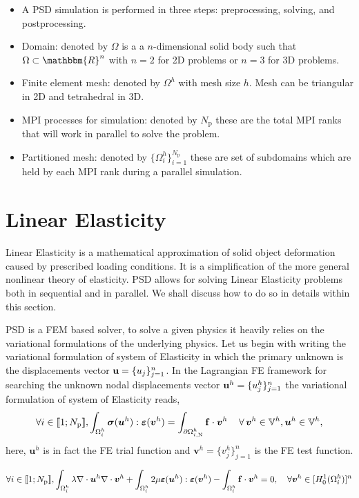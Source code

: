 \documentclass{report}
\newcommand{\bu}{\textbf{u}}
\newcommand{\buh}{\boldsymbol u^h}
\newcommand{\bvh}{\boldsymbol v^h}
\newcommand{\np}{N_\text{p}}
\newcommand{\sig}{\boldsymbol{\sigma}}
\newcommand{\eps}{\boldsymbol{\varepsilon}}
\def\bu{{\bf{u}}}
\begin{document}
\begin{itemize}
    \item A PSD simulation is performed in three steps: preprocessing, solving, and postprocessing. 
    \item Domain: denoted by $\Omega$ is a a $n$-dimensional solid body such that $\Omega \subset \mathbbm{R}^n$ with $n=2$   for 2D problems or  $n=3$ for 3D problems.
    \item Finite element mesh: denoted by $\Omega^h$ with mesh size $h$. Mesh can be triangular in 2D and tetrahedral in 3D.
    \item MPI processes for simulation: denoted by $\np$ these are the total MPI ranks that will work in parallel to solve the problem.
    \item Partitioned mesh: denoted by $\{ \Omega ^h_i \}_{i=1}^{\np}$ these are set of subdomains which are held by each MPI rank during a parallel simulation.
\end{itemize}

\section{Linear Elasticity}
Linear Elasticity is a mathematical approximation of solid object deformation caused by prescribed loading conditions. It is a simplification of the more general nonlinear theory of elasticity. PSD allows for solving Linear Elasticity problems both in sequential and in parallel. We shall discuss how to do so in details within this section.


PSD is a FEM based solver, to solve a given physics it heavily relies on the variational formulations of the underlying physics. Let us begin with writing the variational formulation of system of  Elasticity in which the primary unknown is the displacements vector $\bu=\{u_j\}^n_{j=1}$. In the Lagrangian FE framework for searching the unknown nodal displacements vector $\bu^h=\{u^h_j\}^n_{j=1}$ the variational formulation of system of  Elasticity reads,
%
%
\begin{equation}\label{Eq:Varf}
\forall i \in \llbracket 1; N_{\text p} \rrbracket,  \int_{\Omega^h_i}\sig(\buh) : \eps(\bvh) = \int_{\partial\Omega^h_{i,\text{N}}} \mathbf{f}\cdot\bvh \, \quad\forall\,\bvh\in\mathbb{V}^h,\buh\in\mathbb{V}^h,
\end{equation}
%
here,  $\buh$ is in fact the FE trial function and $\bvh=\{v^h_j\}^n_{j=1}$ is the FE test function.

\begin{equation}\label{Eq:LinearElasticity}
\forall i \in \llbracket 1; N_{\text p} \rrbracket, 
\int_{\Omega^h_i}\lambda\nabla\cdot\buh\nabla\cdot\bvh + \int_{\Omega^h_i}2\mu\boldsymbol\varepsilon(\buh):\boldsymbol\varepsilon(\bvh)-\int_{\Omega^h_i}\mathbf{f}\cdot\bvh=0, \quad\forall\bvh\in[H^1_0(\Omega^h_i)]^n 
\end{equation}
\end{document}
